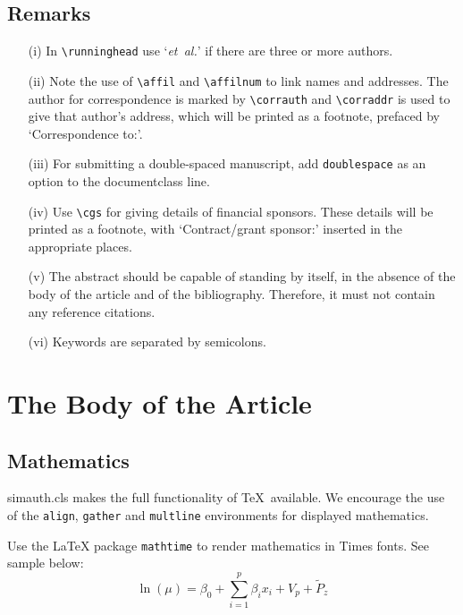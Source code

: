 \documentclass[times]{simauth}
\begin{document}
\subsection{Remarks}
\begin{enumerate}
\item[(i)] In \verb"\runninghead" use `\emph{et~al.}' if there are
three or more authors.

\item[(ii)] Note the use of \verb"\affil" and \verb"\affilnum" to
link names and addresses. The author for correspondence is marked
by \verb"\corrauth" and \verb"\corraddr" is used to give that
author's address, which will be printed as a footnote, prefaced by
`Correspondence to:'.

\item[(iii)] For submitting a double-spaced manuscript, add
\verb"doublespace" as an option to the documentclass line.

\item[(iv)] Use \verb"\cgs" for giving details of financial
sponsors. These details will be printed as a footnote, with
`Contract/grant sponsor:' inserted in the appropriate places.

\item[(v)] The abstract should be capable of standing by itself,
in the absence of the body of the article and of the bibliography.
Therefore, it must not contain any reference citations.

\item[(vi)] Keywords are separated by semicolons.
\end{enumerate}


\section{The Body of the Article}

\subsection{Mathematics} \textsf{simauth.cls} makes the full
functionality of \AmS\/\TeX\ available. We encourage the use of
the \verb"align", \verb"gather" and \verb"multline" environments
for displayed mathematics.

Use the LaTeX package \verb"mathtime" to render mathematics in Times fonts. See sample below:
\begin{equation}
\label{eq1}
\ln \left( \mu \right)=\beta_0 +\sum\limits_{i=1}^p {\beta_i x_i} + V_{p} + \tilde{P}_{z}
\end{equation}
\end{document}

